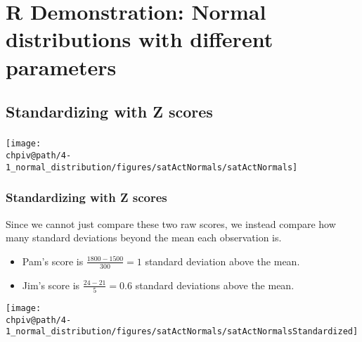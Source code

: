 \documentclass[slidestop,compress,mathserif]{beamer}
\makeatletter
\def\chpiv@path{../../Chp 4}
\makeatother
\begin{document}

\section{R Demonstration: Normal distributions with different parameters}


\subsection{Standardizing with Z scores}


\begin{frame}
\frametitle{}


\begin{center}
\texttt{[image: \\chpiv@path/4-1\_normal\_distribution/figures/satActNormals/satActNormals]}
\end{center}

\end{frame}


\begin{frame}
\frametitle{Standardizing with Z scores}

Since we cannot just compare these two raw scores, we instead compare how many standard deviations beyond the mean each observation is.

\begin{itemize}

\item Pam's score is $\frac{1800 - 1500}{300} = 1$ standard deviation above the mean.

\item Jim's score is $\frac{24 - 21}{5} = 0.6$ standard deviations above the mean.

\end{itemize}

\begin{center}
\texttt{[image: \\chpiv@path/4-1\_normal\_distribution/figures/satActNormals/satActNormalsStandardized]}
\end{center}

\end{frame}
\end{document}
